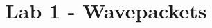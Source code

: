 \documentclass[11pt, letterpaper]{article}
\title{Lab 1 - Wavepackets}
\begin{document}
\makeproblem
\end{document}
